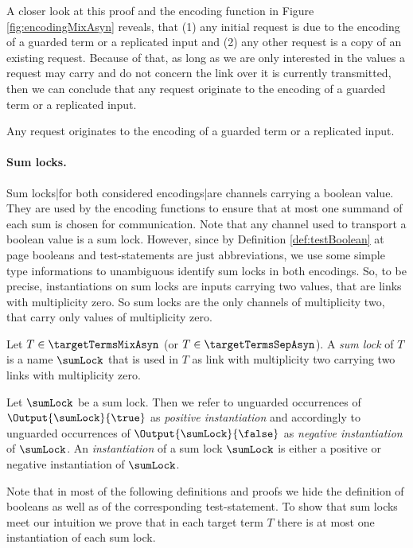 \documentclass[]{llncs}
\begin{document}
A closer look at this proof and the encoding function in Figure \ref{fig:encodingMixAsyn} reveals, that (1) any initial request is due to the encoding of a guarded term or a replicated input and (2) any other request is a copy of an existing request. Because of that, as long as we are only interested in the values a request may carry and do not concern the link over it is currently transmitted, then we can conclude that any request originate to the encoding of a guarded term or a replicated input.
\begin{corollary} \label{col:originRequests}
	Any request originates to the encoding of a guarded term or a replicated input.
\end{corollary}

\paragraph*{Sum locks.} Sum locks|for both considered encodings|are channels carrying a boolean value. They are used by the encoding functions to ensure that at most one summand of each sum is chosen for communication. Note that any channel used to transport a boolean value is a sum lock. However, since by Definition \ref{def:testBoolean} at page \pageref{def:testBoolean} booleans and test-statements are just abbreviations, we use some simple type informations to unambiguous identify sum locks in both encodings. So, to be precise, instantiations on sum locks are inputs carrying two values, that are links with multiplicity zero. So sum locks are the only channels of multiplicity two, that carry only values of multiplicity zero.

\begin{definition} \label{def:sumLock}
	Let $ T \in \targetTermsMixAsyn $ (or $ T \in \targetTermsSepAsyn $). A \emph{sum lock} of $ T $ is a name $ \sumLock $ that is used in $ T $ as link with multiplicity two carrying two links with multiplicity zero.
	
	Let $ \sumLock $ be a sum lock. Then we refer to unguarded occurrences of $ \Output{\sumLock}{\true} $ as \emph{positive instantiation} and accordingly to unguarded occurrences of $ \Output{\sumLock}{\false} $ as \emph{negative instantiation} of $ \sumLock $. An \emph{instantiation} of a sum lock $ \sumLock $ is either a positive or negative instantiation of $ \sumLock $.
\end{definition}

Note that in most of the following definitions and proofs we hide the definition of booleans as well as of the corresponding test-statement. To show that sum locks meet our intuition we prove that in each target term $ T $ there is at most one instantiation of each sum lock.
\end{document}
